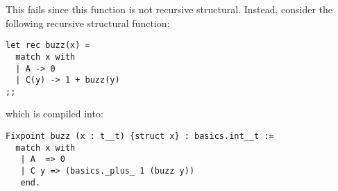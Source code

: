 This fails since this function is not recursive structural. Instead,
consider the following recursive structural function:

{\footnotesize
\begin{lstlisting}
let rec buzz(x) =
  match x with
  | A -> 0
  | C(y) -> 1 + buzz(y)
;;
\end{lstlisting}
}

\noindent which is compiled into:

{\footnotesize
\begin{lstlisting}[language=MyCoq]
Fixpoint buzz (x : t__t) {struct x} : basics.int__t :=
  match x with
   | A  => 0
   | C y => (basics._plus_ 1 (buzz y))
   end.
\end{lstlisting}
}
